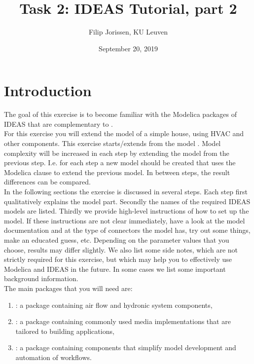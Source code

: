 \documentclass[10pt,a4paper]{article}
\begin{document}
\title{Task 2: IDEAS Tutorial, part 2}
\author{Filip Jorissen, KU Leuven}
\date{September 20, 2019}
\maketitle

\section*{Introduction}
The goal of this exercise is to become familiar with the 
Modelica packages of IDEAS that are
complementary to . \\

For this exercise you will extend the model of a simple house,
using HVAC and other components.
This exercise starts/extends from the model . 
Model complexity will be increased in each step by 
extending the model from the previous step. 
I.e. for each step a new model should be created that uses
the Modelica  clause to extend the previous model.
In between steps, the result differences can be compared.\\


In the following sections the exercise is discussed 
in several steps. 
Each step first qualitatively explains the model part.
Secondly the names of the required IDEAS models 
are listed.
Thirdly we provide high-level instructions of how to
set up the model.
If these instructions are not clear immediately, 
have a look at the model documentation and at the type of
connectors the model has, 
try out some things, 
make an educated guess, etc.
Depending on the parameter values that you choose, results
may differ slightly.
We also list some side notes, which are not strictly required for this
exercise, but which may help you to effectively use Modelica
and IDEAS in the future.
In some cases we list some important background information.\\

The main packages that you will need are:
\begin{enumerate}
\item {}: a package containing air flow and hydronic system components,
\item {}: a package containing commonly used media implementations that are tailored to building applications,
\item {}: a package containing components that simplify model development and automation of workflows.
\end{enumerate}
\end{document}
